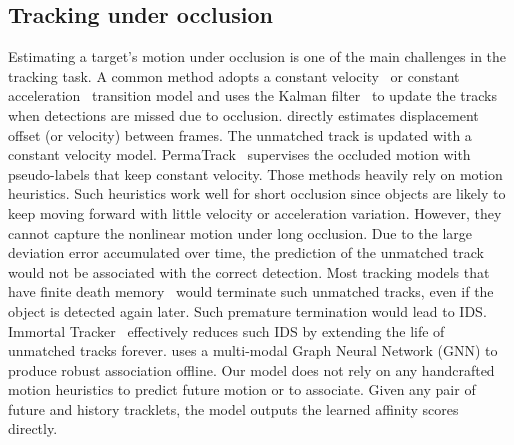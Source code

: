 \documentclass{article} \usepackage{iclr2023_conference,times}
\begin{document}
\subsection{Tracking under occlusion}
\vspace{-1mm}
Estimating a target's motion under occlusion is one of the main challenges in the tracking task.
A common method adopts a constant velocity~\cite{basline_with_AMOTA, Immortaltrackers} or constant acceleration~\cite{CAMOMOT} transition model and uses the Kalman filter~\cite{kalman_filter} to update the tracks when detections are missed due to occlusion. \cite{Centerpoint} directly estimates displacement offset (or velocity) between frames. The unmatched track is updated with a constant velocity model. PermaTrack~\cite{Object_permanence} supervises the occluded motion with pseudo-labels that keep constant velocity. Those methods heavily rely on motion heuristics. Such heuristics work well for short occlusion since objects are likely to keep moving forward with little velocity or acceleration variation. However, they cannot capture the nonlinear motion under long occlusion.
Due to the large deviation error accumulated over time, the prediction of the unmatched track would not be associated with the correct detection. Most tracking models that have finite death memory~\cite{Centerpoint,basline_with_AMOTA} would terminate such unmatched tracks, even if the object is detected again later. Such premature termination would lead to IDS. Immortal Tracker~\cite{Immortaltrackers} effectively reduces such IDS by extending the life of unmatched tracks forever. \cite{batch3dmot} uses a multi-modal Graph Neural Network (GNN) to produce robust association offline. 
Our model does not rely on any handcrafted motion heuristics to predict future motion or to associate.
Given any pair of future and history tracklets, the model outputs the learned affinity scores directly.





\vspace{-2mm}
\end{document}
